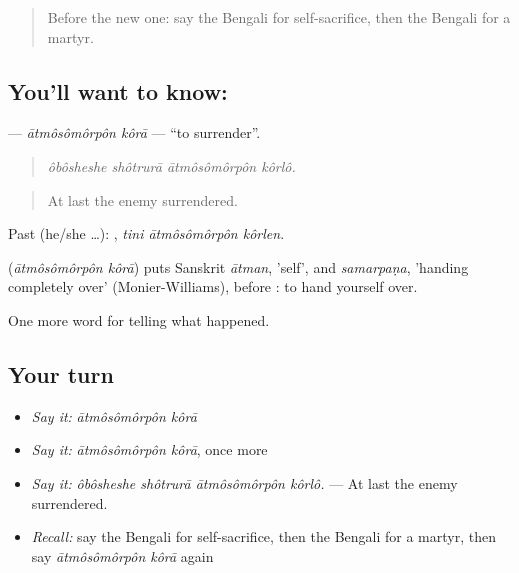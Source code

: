 \label{lesson:BN-C317-atmosomorpon-kora}



\begin{quote}
Before the new one: say the Bengali for self-sacrifice, then the Bengali for a martyr.
\end{quote}

\subsection*{You'll want to know:  }
\textbf{ } — \emph{ātmôsômôrpôn kôrā} — \textquotedblleft{}to surrender\textquotedblright{}.

\begin{quote}
   
\end{quote}

\begin{quote}
\emph{ôbôsheshe shôtrurā ātmôsômôrpôn kôrlô.}
\end{quote}

\begin{quote}
At last the enemy surrendered.
\end{quote}

Past (he/she …):   , \emph{tini ātmôsômôrpôn kôrlen}.

\begin{cousinweb}
\textbf{ } (\emph{ātmôsômôrpôn kôrā}) puts Sanskrit \emph{ātman}, 'self', and \emph{samarpaṇa}, 'handing completely over' (Monier-Williams), before : to hand yourself over.
\end{cousinweb}

\begin{grammarlens}[title={What you've built}]
One more word for telling what happened.
\end{grammarlens}

\subsection*{Your turn}
\begin{itemize}
\raggedright
  \item \emph{Say it:} \emph{ātmôsômôrpôn kôrā}
  \item \emph{Say it:} \emph{ātmôsômôrpôn kôrā}, once more
  \item \emph{Say it:} \emph{ôbôsheshe shôtrurā ātmôsômôrpôn kôrlô.} — At last the enemy surrendered.
  \item \emph{Recall:} say the Bengali for self-sacrifice, then the Bengali for a martyr, then say \emph{ātmôsômôrpôn kôrā} again
\end{itemize}

